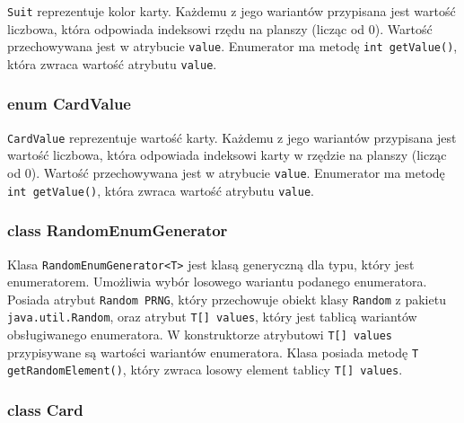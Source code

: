 \documentclass{article}
\begin{document}
\texttt{Suit} reprezentuje kolor karty. Każdemu z jego wariantów przypisana jest wartość liczbowa, która odpowiada indeksowi rzędu na planszy (licząc od 0). Wartość przechowywana jest w atrybucie \texttt{value}. Enumerator ma metodę \texttt{int getValue()}, która zwraca wartość atrybutu \texttt{value}.

\subsubsection*{enum CardValue}
\texttt{CardValue} reprezentuje wartość karty. Każdemu z jego wariantów przypisana jest wartość liczbowa, która odpowiada indeksowi karty w rzędzie na planszy (licząc od 0). Wartość przechowywana jest w atrybucie \texttt{value}. Enumerator ma metodę \texttt{int getValue()}, która zwraca wartość atrybutu \texttt{value}.

\subsubsection*{class RandomEnumGenerator}

Klasa \texttt{RandomEnumGenerator<T>} jest klasą generyczną dla typu, który jest enumeratorem. Umożliwia wybór losowego wariantu podanego enumeratora. Posiada atrybut \texttt{Random PRNG}, który przechowuje obiekt klasy \texttt{Random} z pakietu \texttt{java.util.Random}, oraz atrybut \texttt{T[] values}, który jest tablicą wariantów obsługiwanego enumeratora. W konstruktorze atrybutowi \texttt{T[] values} przypisywane są wartości wariantów enumeratora. Klasa posiada metodę \texttt{T getRandomElement()}, który zwraca losowy element tablicy \texttt{T[] values}.

\begin{center}
\end{center}

\newpage

\subsubsection*{class Card}
\end{document}
